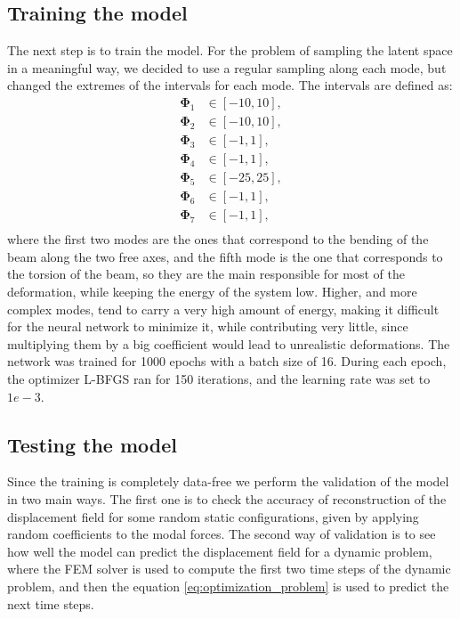 \subsection{Training the model}
\label{sec:training_model}
The next step is to train the model. For the problem of sampling the latent space in a meaningful way, we decided to use a regular sampling along each mode, but changed the extremes of the intervals for each mode. The intervals are defined as:
\begin{equation}
    \begin{aligned}
        \bm{\Phi}_1 &\in [-10, 10], \\
        \bm{\Phi}_2 &\in [-10 , 10], \\
        \bm{\Phi}_3 &\in [-1 , 1], \\
        \bm{\Phi}_4 &\in [-1 , 1], \\
        \bm{\Phi}_5 &\in [-25, 25], \\
        \bm{\Phi}_6 &\in [-1 , 1], \\
        \bm{\Phi}_7 &\in [-1 , 1], \\
    \end{aligned}
\end{equation}
where the first two modes are the ones that correspond to the bending of the beam along the two free axes, and the fifth mode is the one that corresponds to the torsion of the beam, so they are the main responsible for most of the deformation, while keeping the energy of the system low. Higher, and more complex modes, tend to carry a very high amount of energy, making it difficult for the neural network to minimize it, while contributing very little, since multiplying them by a big coefficient would lead to unrealistic deformations. The network was trained for 1000 epochs with a batch size of 16. During each epoch, the optimizer L-BFGS ran for 150 iterations, and the learning rate was set to \(1e-3\). 


\subsection{Testing the model}
\label{sec:testing_model}
Since the training is completely data-free we perform the validation of the model in two main ways. The first one is to check the accuracy of reconstruction of the displacement field for some random static configurations, given by applying random coefficients to the modal forces. The second way of validation is to see how well the model can predict the displacement field for a dynamic problem, where the FEM solver is used to compute the first two time steps of the dynamic problem, and then the equation \ref{eq:optimization_problem} is used to predict the next time steps. 

